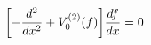 \begin{equation}
 \biggl [ - {{d^2}\over {dx^2}} + V_0^{(2)} (f) \biggr ] 
           {{df}\over {dx}} = 0
\label{schrodinger0}
\end{equation}

